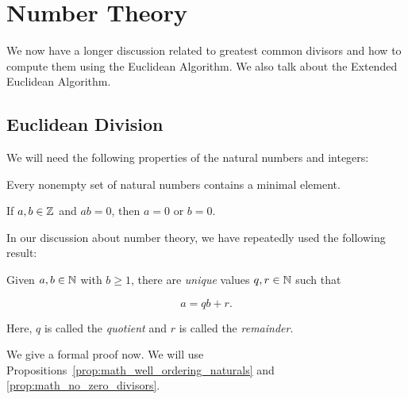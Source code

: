 \section{Number Theory}
\label{app:math_nt}

We now have a longer discussion related to greatest common divisors
and how to compute them using the Euclidean Algorithm.
We also talk about the Extended Euclidean Algorithm.

\subsection{Euclidean Division}

We will need the following properties of the natural numbers and integers:

\begin{prop}
\label{prop:math_well_ordering_naturals}
Every nonempty set of natural numbers contains a minimal element.
\end{prop}

\begin{prop}
\label{prop:math_no_zero_divisors}
If $a,b\in\mathbb{Z}$ and $ab=0$, then $a=0$ or $b=0$.
\end{prop}

In our discussion about \gls{number theory},
we have repeatedly used the following result:

\begin{prop}
\label{prop:math_euclid_division}
Given $a,b\in\mathbb{N}$ with $b\ge1$, there are \emph{unique} values
$q,r\in\mathbb{N}$ such that

\begin{equation}
    a = qb + r.
\end{equation}

\noindent
Here, $q$ is called the \emph{quotient} and $r$ is called the \emph{remainder}.
\end{prop}

We give a formal proof now.
We will use Propositions~\ref{prop:math_well_ordering_naturals}
and \ref{prop:math_no_zero_divisors}.

